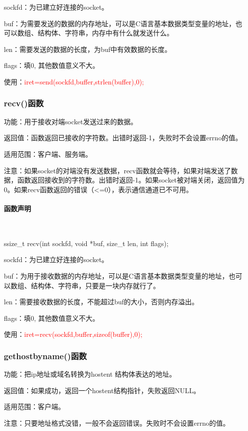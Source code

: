 \documentclass[UTF8]{article}%
\begin{document}
sockfd：为已建立好连接的socket。

buf：为需要发送的数据的内存地址，可以是C语言基本数据类型变量的地址，也可以数组、结构体、字符串，内存中有什么就发送什么。

len：需要发送的数据的长度，为buf中有效数据的长度。

flags：填0, 其他数值意义不大。

使用：\textcolor{red}{iret=send(sockfd,buffer,strlen(buffer),0);}

\subsubsection{recv()函数}

功能：用于接收对端socket发送过来的数据。

返回值：函数返回已接收的字符数。出错时返回-1，失败时不会设置errno的值。

适用范围：客户端、服务端。

注意：如果socket的对端没有发送数据，recv函数就会等待，如果对端发送了数据，函数返回接收到的字符数。出错时返回-1。如果socket被对端关闭，返回值为0。如果recv函数返回的错误（<=0），表示通信通道已不可用。

\paragraph{函数声明}~{}

ssize\_t recv(int sockfd, void *buf, size\_t len, int flags);

sockfd：为已建立好连接的socket。

buf：为用于接收数据的内存地址，可以是C语言基本数据类型变量的地址，也可以数组、结构体、字符串，只要是一块内存就行了。

len：需要接收数据的长度，不能超过buf的大小，否则内存溢出。

flags：填0, 其他数值意义不大。

使用：\textcolor{red}{iret=recv(sockfd,buffer,sizeof(buffer),0);}

\subsubsection{gethostbyname()函数}

功能：把ip地址或域名转换为hostent 结构体表达的地址。

返回值：如果成功，返回一个hostent结构指针，失败返回NULL。

适用范围：客户端。

注意：只要地址格式没错，一般不会返回错误。失败时不会设置errno的值。
\end{document}
